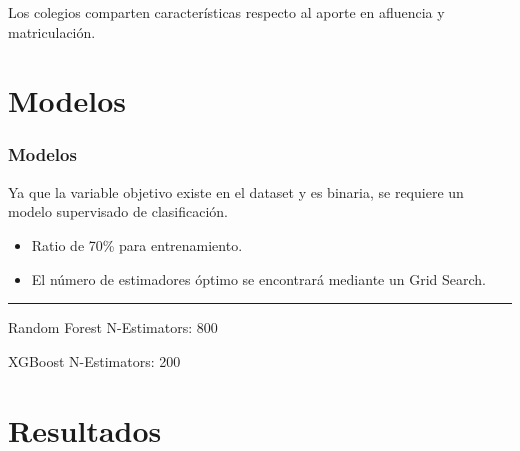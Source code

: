\documentclass[aspectratio=149]{beamer}
\begin{document}
\begin{frame}
\begin{columns}
\begin{column}{0.52\textwidth}
		\end{column}
	\end{columns}
	\vspace{1cm}
	Los colegios comparten características respecto al aporte en afluencia y matriculación.
\end{frame}

\section{Modelos}
\begin{frame}
	\frametitle{Modelos}
	Ya que la variable objetivo existe en el dataset y es binaria, se requiere un modelo supervisado de clasificación. \\
	\begin{itemize}
		\item Ratio de 70\% para entrenamiento. 
		\item El número de estimadores óptimo se encontrará mediante un Grid Search.
	\end{itemize}
	
	\noindent\rule{10cm}{0.4pt}

	\begin{block}{Random Forest}
		N-Estimators: 800
	\end{block}

	\begin{block}{XGBoost}
		N-Estimators: 200
	\end{block}
\end{frame}


\section{Resultados}
\end{document}
